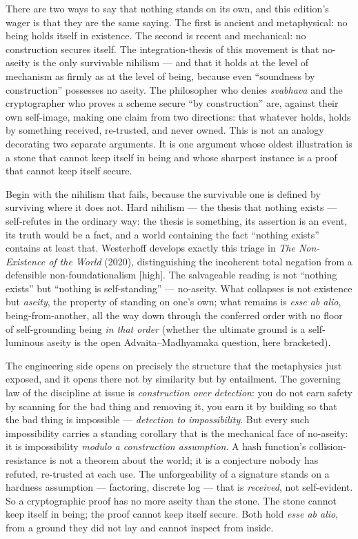 \documentclass[11pt]{article}
\begin{document}
There are two ways to say that nothing stands on its own, and this edition's wager is that they are the same saying. The first is ancient and metaphysical: no being holds itself in existence. The second is recent and mechanical: no construction secures itself. The integration-thesis of this movement is that no-aseity is the only survivable nihilism — and that it holds at the level of mechanism as firmly as at the level of being, because even ``soundness by construction'' possesses no aseity. The philosopher who denies \emph{svabhava} and the cryptographer who proves a scheme secure ``by construction'' are, against their own self-image, making one claim from two directions: that whatever holds, holds by something received, re-trusted, and never owned. This is not an analogy decorating two separate arguments. It is one argument whose oldest illustration is a stone that cannot keep itself in being and whose sharpest instance is a proof that cannot keep itself secure.

Begin with the nihilism that fails, because the survivable one is defined by surviving where it does not. Hard nihilism — the thesis that nothing exists — self-refutes in the ordinary way: the thesis is something, its assertion is an event, its truth would be a fact, and a world containing the fact ``nothing exists'' contains at least that. Westerhoff develops exactly this triage in \emph{The Non-Existence of the World} (2020), distinguishing the incoherent total negation from a defensible non-foundationalism [high]. The salvageable reading is not ``nothing exists'' but ``nothing is self-standing'' — no-aseity. What collapses is not existence but \emph{aseity}, the property of standing on one's own; what remains is \emph{esse ab alio}, being-from-another, all the way down through the conferred order with no floor of self-grounding being \emph{in that order} (whether the ultimate ground is a self-luminous aseity is the open Advaita–Madhyamaka question, here bracketed).

The engineering side opens on precisely the structure that the metaphysics just exposed, and it opens there not by similarity but by entailment. The governing law of the discipline at issue is \emph{construction over detection}: you do not earn safety by scanning for the bad thing and removing it, you earn it by building so that the bad thing is impossible — \emph{detection to impossibility}. But every such impossibility carries a standing corollary that is the mechanical face of no-aseity: it is impossibility \emph{modulo a construction assumption}. A hash function's collision-resistance is not a theorem about the world; it is a conjecture nobody has refuted, re-trusted at each use. The unforgeability of a signature stands on a hardness assumption — factoring, discrete log — that is \emph{received}, not self-evident. So a cryptographic proof has no more aseity than the stone. The stone cannot keep itself in being; the proof cannot keep itself secure. Both hold \emph{esse ab alio}, from a ground they did not lay and cannot inspect from inside.
\end{document}
